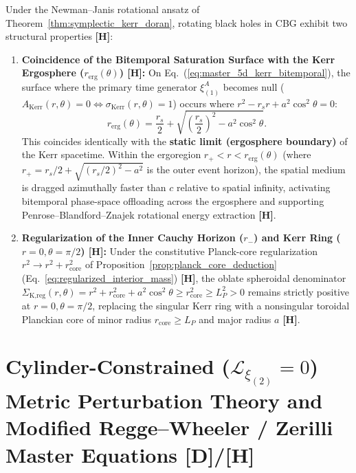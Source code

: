 \documentclass[11pt,a4paper]{article}
\newcommand{\catD}{\textbf{\textcolor{blue!75!black}{[D]}}}
\newcommand{\catH}{\textbf{\textcolor{orange!85!black}{[H]}}}
\theoremstyle{plain}
\theoremstyle{definition}
\theoremstyle{remark}
\numberwithin{equation}{section}
\begin{document}
Under the Newman--Janis rotational ansatz of Theorem~\ref{thm:symplectic_kerr_doran}, rotating black holes in CBG exhibit two structural properties \catH:
\begin{enumerate}
    \item \textbf{Coincidence of the Bitemporal Saturation Surface with the Kerr Ergosphere ($r_{\text{erg}}(\theta)$) \catH:} On Eq.~(\ref{eq:master_5d_kerr_bitemporal}), the surface where the primary time generator $\xi_{(1)}^A$ becomes null ($A_{\text{Kerr}}(r,\theta) = 0 \iff \sigma_{\text{Kerr}}(r, \theta) = 1$) occurs where $r^2 - r_s r + a^2\cos^2\theta = 0$:
    \begin{equation}
    r_{\text{erg}}(\theta) = \frac{r_s}{2} + \sqrt{\left(\frac{r_s}{2}\right)^2 - a^2\cos^2\theta}.
    \label{eq:kerr_ergosphere_surface}
    \end{equation}
    This coincides identically with the \textbf{static limit (ergosphere boundary)} of the Kerr spacetime. Within the ergoregion $r_+ < r < r_{\text{erg}}(\theta)$ (where $r_+ = r_s/2 + \sqrt{(r_s/2)^2 - a^2}$ is the outer event horizon), the spatial medium is dragged azimuthally faster than $c$ relative to spatial infinity, activating bitemporal phase-space offloading across the ergosphere and supporting Penrose--Blandford--Znajek rotational energy extraction \cite{penrose1969,blandford1977} \catH.

    \item \textbf{Regularization of the Inner Cauchy Horizon ($r_-$) and Kerr Ring ($r = 0, \theta = \pi/2$) \catH:} Under the constitutive Planck-core regularization $r^2 \to r^2 + r_{\text{core}}^2$ of Proposition~\ref{prop:planck_core_deduction} (Eq.~\ref{eq:regularized_interior_mass}) \catH, the oblate spheroidal denominator $\Sigma_{\text{K,reg}}(r, \theta) = r^2 + r_{\text{core}}^2 + a^2\cos^2\theta \ge r_{\text{core}}^2 \ge L_P^2 > 0$ remains strictly positive at $r = 0, \theta = \pi/2$, replacing the singular Kerr ring with a nonsingular toroidal Planckian core of minor radius $r_{\text{core}} \ge L_P$ and major radius $a$ \catH.
\end{enumerate}

\section{\texorpdfstring{Cylinder-Constrained ($\mathcal{L}_{\xi_{(2)}} = 0$) Metric Perturbation Theory and Modified Regge--Wheeler / Zerilli Master Equations \catD/\catH}{Cylinder-Constrained Metric Perturbation Theory and Modified Regge-Wheeler / Zerilli Master Equations}}
\end{document}
